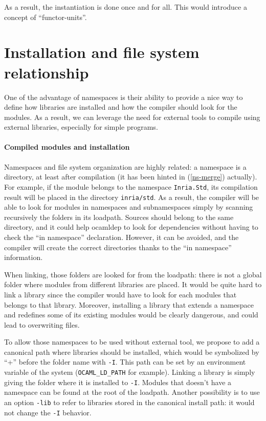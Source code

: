 As a result, the instantiation is done once and for all. This would introduce a
concept of ``functor-units''.

\section{Installation and file system relationship}

One of the advantage of namespaces is their ability to provide a nice way to
define how libraries are installed and how the compiler should look for the
modules. As a result, we can leverage the need for external tools to compile
using external libraries, especially for simple programs.

\paragraph{Compiled modules and installation}

Namespaces and file system organization are highly related: a namespace is a
directory, at least after compilation (it has been hinted in (\ref{ns-merge})
actually). For example, if the module belongs to the namespace
\texttt{Inria.Std}, its compilation result will be placed in the directory
\texttt{inria/std}. As a result, the compiler will be able to look for modules
in namespaces and subnamespaces simply by scanning recursively the folders in
its loadpath. Sources should belong to the same directory, and it could help
ocamldep to look for dependencies without having to check the ``in namespace''
declaration. However, it can be avoided, and the compiler will create the
correct directories thanks to the ``in namespace'' information.

When linking, those folders are looked for from the loadpath: there is not a
global folder where modules from different libraries are placed. It would be
quite hard to link a library since the compiler would have to look for each
modules that belongs to that library. Moreover, installing a library that
extends a namespace and redefines some of its existing modules would be clearly
dangerous, and could lead to overwriting files.

To allow those namespaces to be used without external tool, we propose to add a
canonical path where libraries should be installed, which would be symbolized by
``+'' before the folder name with \texttt{-I}. This path can be set by an
environment variable of the system (\texttt{OCAML\_LD\_PATH} for
example). Linking a library is simply giving the folder where it is installed to
\texttt{-I}. Modules that doesn't have a namespace can be found at the root of
the loadpath. Another possibility is to use an option \texttt{-lib} to refer to
libraries stored in the canonical install path: it would not change the \texttt{-I}
behavior.

